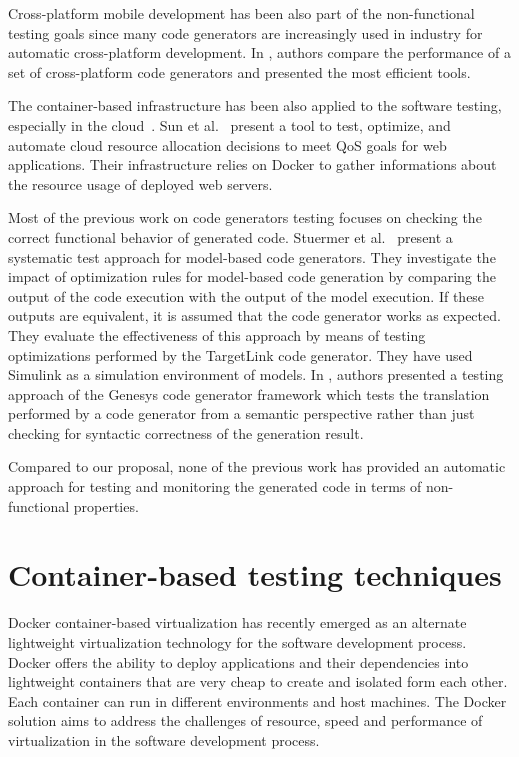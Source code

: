 Cross-platform mobile development has been also part of the non-functional testing goals since many code generators are increasingly used in industry for automatic cross-platform development. In \cite{pazirandeh2015evaluation,hartmann2011cross}, authors compare the performance of a set of cross-platform code generators and presented the most efficient tools.

The container-based infrastructure has been also applied to the software testing, especially in the cloud~\cite{li2015rest}. Sun et al.~\cite{sun2016roar} present a tool to test, optimize, and automate cloud resource allocation decisions to meet QoS goals for web applications. Their infrastructure relies on Docker to gather informations about the resource usage of deployed web servers. 

Most of the previous work on code generators testing focuses on checking the correct functional behavior of generated code. Stuermer et al.~\cite{stuermer2007systematic} present a systematic test approach for model-based code generators. They investigate the impact of optimization rules for model-based code generation by comparing the output of the code execution with the output of the model execution. 
If these outputs are equivalent, it is assumed that the code generator works as expected. 
They evaluate the effectiveness of this approach by means of testing optimizations performed by the TargetLink code generator. 
They have used Simulink as a simulation environment of models. 
In \cite{jorges2014back}, authors presented a testing approach of the Genesys code generator framework which tests the translation performed by a code generator from a semantic perspective rather than just checking for syntactic correctness of the generation result.

Compared to our proposal, none of the previous work has provided an automatic approach for testing and monitoring the generated code in terms of non-functional properties. 


\section{Container-based testing techniques}

Docker container-based virtualization has recently emerged as an alternate lightweight virtualization technology for the software development process\cite{naik2016migrating}. Docker offers the ability to deploy applications and their dependencies into lightweight containers that are very cheap to create and isolated form each other. Each container can run in different environments and host machines. The Docker solution aims to address the challenges of resource, speed and performance of virtualization in the software development process. 

